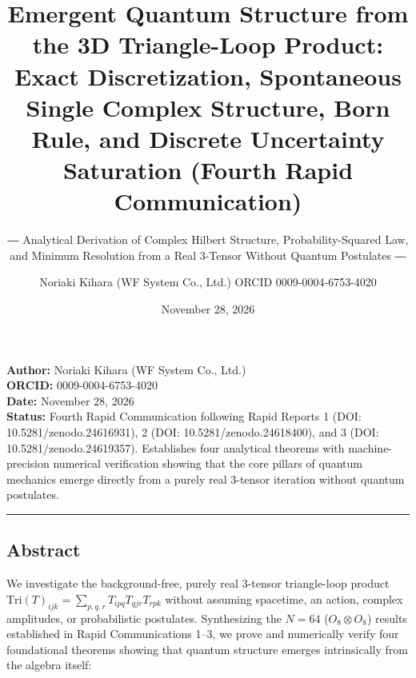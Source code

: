 \documentclass[
  a4paper,
]{article}
\title{Emergent Quantum Structure from the 3D Triangle-Loop Product:
Exact Discretization, Spontaneous Single Complex Structure, Born Rule,
and Discrete Uncertainty Saturation (Fourth Rapid Communication)}
\subtitle{― Analytical Derivation of Complex Hilbert Structure,
Probability-Squared Law, and Minimum Resolution from a Real 3-Tensor
Without Quantum Postulates ―}
\author{Noriaki Kihara (WF System Co., Ltd.) ORCID 0009-0004-6753-4020}
\date{November 28, 2026}
\begin{document}
\maketitle

\textbf{Author:} Noriaki Kihara (WF System Co., Ltd.)\\
\textbf{ORCID:} 0009-0004-6753-4020\\
\textbf{Date:} November 28, 2026\\
\textbf{Status:} Fourth Rapid Communication following Rapid Reports 1
(DOI: 10.5281/zenodo.24616931), 2 (DOI: 10.5281/zenodo.24618400), and 3
(DOI: 10.5281/zenodo.24619357). Establishes four analytical theorems
with machine-precision numerical verification showing that the core
pillars of quantum mechanics emerge directly from a purely real 3-tensor
iteration without quantum postulates.

\begin{center}\rule{0.5\linewidth}{0.5pt}\end{center}

\subsection{Abstract}\label{abstract}

We investigate the background-free, purely real 3-tensor triangle-loop
product \(\mathrm{Tri}(T)_{ijk} = \sum_{p,q,r} T_{ipq} T_{qjr} T_{rpk}\)
without assuming spacetime, an action, complex amplitudes, or
probabilistic postulates. Synthesizing the \(N = 64\)
(\(O_8 \otimes O_8\)) results established in Rapid Communications 1--3,
we prove and numerically verify four foundational theorems showing that
quantum structure emerges intrinsically from the algebra itself:
\end{document}
